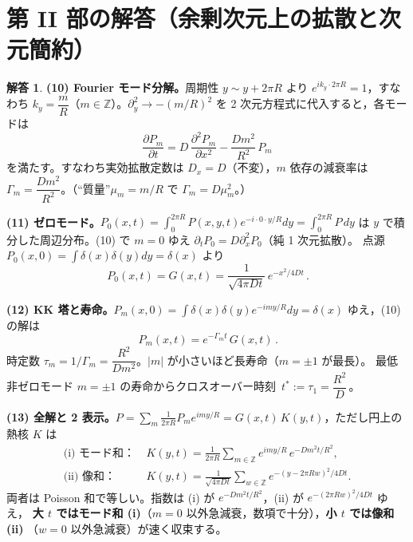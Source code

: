 \documentclass[dvipdfmx, uplatex]{jsarticle}
\theoremstyle{definition}
\newtheorem*{sol}{解答}
\begin{document}
\section{第 II 部の解答（余剰次元上の拡散と次元簡約）}

\begin{sol}
\textbf{(10) Fourier モード分解。}周期性 $y\sim y+2\pi R$ より $e^{ik_y\cdot2\pi R}=1$，すなわち
$\boxed{k_y=\dfrac{m}{R}}$（$m\in\mathbb{Z}$）。$\partial_y^2\to-(m/R)^2$ を 2 次元方程式に代入すると，各モードは
\[
    \boxed{\,\frac{\partial P_m}{\partial t}=D\,\frac{\partial^2 P_m}{\partial x^2}-\frac{Dm^2}{R^2}\,P_m\,}
\]
を満たす。すなわち実効拡散定数は $\boxed{D_x=D}$（不変），$m$ 依存の減衰率は
$\boxed{\Gamma_m=\dfrac{Dm^2}{R^2}}$。（``質量''$\mu_m=m/R$ で $\Gamma_m=D\mu_m^2$。）

\par\smallskip
\textbf{(11) ゼロモード。}$P_0(x,t)=\int_0^{2\pi R}P(x,y,t)e^{-i\cdot0\cdot y/R}dy=\int_0^{2\pi R}P\,dy$ は
$y$ で積分した周辺分布。(10) で $m=0$ ゆえ $\boxed{\partial_tP_0=D\partial_x^2P_0}$（純 1 次元拡散）。
点源 $P_0(x,0)=\int\delta(x)\delta(y)dy=\delta(x)$ より
\[
    \boxed{\,P_0(x,t)=G(x,t)=\frac{1}{\sqrt{4\pi Dt}}\,e^{-x^2/4Dt}\,}.
\]

\par\smallskip
\textbf{(12) KK 塔と寿命。}$P_m(x,0)=\int\delta(x)\delta(y)e^{-imy/R}dy=\delta(x)$ ゆえ，(10) の解は
\[
    \boxed{\,P_m(x,t)=e^{-\Gamma_m t}\,G(x,t)\,}.
\]
時定数 $\boxed{\tau_m=1/\Gamma_m=\dfrac{R^2}{Dm^2}}$。$|m|$ が小さいほど長寿命（$m=\pm1$ が最長）。
最低非ゼロモード $m=\pm1$ の寿命からクロスオーバー時刻
$\boxed{\,t^\ast:=\tau_1=\dfrac{R^2}{D}\,}$。

\par\smallskip
\textbf{(13) 全解と 2 表示。}$P=\sum_m\frac{1}{2\pi R}P_m e^{imy/R}=G(x,t)\,K(y,t)$，ただし円上の熱核 $K$ は
\begin{align*}
    \text{(i) モード和：}&\ \boxed{K(y,t)=\frac{1}{2\pi R}\sum_{m\in\mathbb{Z}}e^{imy/R}\,e^{-Dm^2t/R^2}},\\
    \text{(ii) 像和：}&\ \boxed{K(y,t)=\frac{1}{\sqrt{4\pi Dt}}\sum_{w\in\mathbb{Z}}e^{-(y-2\pi Rw)^2/4Dt}}.
\end{align*}
両者は Poisson 和で等しい。指数は (i) が $e^{-Dm^2t/R^2}$，(ii) が $e^{-(2\pi Rw)^2/4Dt}$ ゆえ，
\textbf{大 $t$ ではモード和 (i)}（$m=0$ 以外急減衰，数項で十分），\textbf{小 $t$ では像和 (ii)}
（$w=0$ 以外急減衰）が速く収束する。


\end{sol}
\end{document}
